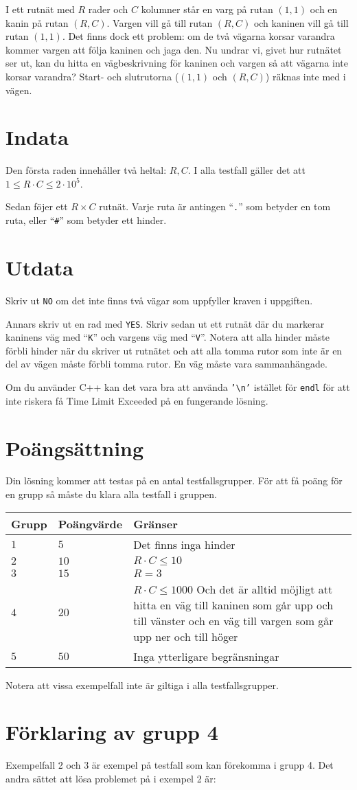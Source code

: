 I ett rutnät med $R$ rader och $C$ kolumner står en varg på rutan $(1, 1)$ och en kanin på rutan $(R, C)$.
Vargen vill gå till rutan $(R, C)$ och kaninen vill gå till rutan $(1, 1)$.
Det finns dock ett problem: om de två vägarna korsar varandra kommer vargen att följa kaninen och jaga den.
Nu undrar vi, givet hur rutnätet ser ut, kan du hitta en vägbeskrivning för kaninen och vargen så att vägarna inte korsar varandra?
Start- och slutrutorna ($(1, 1)$ och $(R, C)$) räknas inte med i vägen.

\section*{Indata}
Den första raden innehåller två heltal: $R, C$. I alla testfall gäller det att $1 \leq R \cdot C \leq 2 \cdot 10^5$.

Sedan föjer ett $R \times C$ rutnät. Varje ruta är antingen ``\texttt{.}'' som betyder en tom ruta, eller ``\texttt{\#}'' som betyder ett hinder.

\section*{Utdata}
Skriv ut \texttt{NO} om det inte finns två vägar som uppfyller kraven i uppgiften.

Annars skriv ut en rad med \texttt{YES}.
Skriv sedan ut ett rutnät där du markerar kaninens väg med ``\texttt{K}'' och vargens väg med ``\texttt{V}''.
Notera att alla hinder måste förbli hinder när du skriver ut rutnätet och att alla tomma rutor som inte är en del av vägen måste förbli tomma rutor.
En väg måste vara sammanhängade.

Om du använder C++ kan det vara bra att använda \texttt{'\textbackslash{}n'} istället för \texttt{endl} för att inte riskera få Time Limit Exceeded på en fungerande lösning.

\section*{Poängsättning}
Din lösning kommer att testas på en antal testfallsgrupper.
För att få poäng för en grupp så måste du klara alla testfall i gruppen.

\noindent
\begin{tabular}{| l | l | p{12cm} |}
  \hline
  Grupp & Poängvärde & Gränser \\ \hline
  $1$   & $5$        & Det finns inga hinder\\ \hline
  $2$   & $10$       & $R \cdot C \leq 10$  \\ \hline
  $3$   & $15$       & $R= 3$  \\ \hline
  $4$   & $20$       & $R \cdot C \leq 1000$ Och det är alltid möjligt att hitta en väg till kaninen som går upp och till vänster och en väg till vargen som går upp ner och till höger  \\ \hline
  $5$   & $50$       & Inga ytterligare begränsningar  \\ \hline
\end{tabular}

Notera att vissa exempelfall inte är giltiga i alla testfallsgrupper.

\section*{Förklaring av grupp 4}
Exempelfall 2 och 3 är exempel på testfall som kan förekomma i grupp 4. Det andra sättet att lösa problemet på i exempel 2 är:

